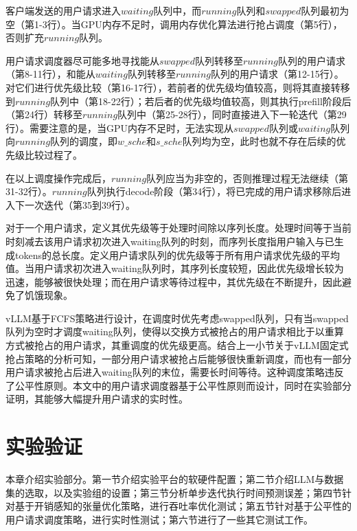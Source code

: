 \documentclass[a4paper, nosysfonts]{hpcchina}
\begin{document}
客户端发送的用户请求进入$waiting$队列中，而$running$队列和$swapped$队列最初为空（第1-3行）。当GPU内存不足时，调用内存优化算法进行抢占调度（第5行），否则扩充$running$队列。 \par
用户请求调度器尽可能多地寻找能从$swapped$队列转移至$running$队列的用户请求（第8-11行），和能从$waiting$队列转移至$running$队列的用户请求（第12-15行）。对它们进行优先级比较（第16-17行），若前者的优先级均值较高，则将其直接转移到$running$队列中（第18-22行）；若后者的优先级均值较高，则其执行prefill阶段后（第24行）转移至$running$队列中（第25-28行），同时直接进入下一轮迭代（第29行）。需要注意的是，当GPU内存不足时，无法实现从$swapped$队列或$waiting$队列向$running$队列的调度，即$w\_sche$和$s\_sche$队列均为空，此时也就不存在后续的优先级比较过程了。 \par
在以上调度操作完成后，$running$队列应当为非空的，否则推理过程无法继续（第31-32行）。$running$队列执行decode阶段（第34行），将已完成的用户请求移除后进入下一次迭代（第35到39行）。 \par
对于一个用户请求，定义其优先级等于处理时间除以序列长度。处理时间等于当前时刻减去该用户请求初次进入waiting队列的时刻，而序列长度指用户输入与已生成tokens的总长度。定义用户请求队列的优先级等于所有用户请求优先级的平均值。当用户请求初次进入waiting队列时，其序列长度较短，因此优先级增长较为迅速，能够被很快处理；而在用户请求等待过程中，其优先级在不断提升，因此避免了饥饿现象。 \par
vLLM基于FCFS策略进行设计，在调度时优先考虑swapped队列，只有当swapped队列为空时才调度waiting队列，使得以交换方式被抢占的用户请求相比于以重算方式被抢占的用户请求，其重调度的优先级更高。结合上一小节关于vLLM固定式抢占策略的分析可知，一部分用户请求被抢占后能够很快重新调度，而也有一部分用户请求被抢占后进入waiting队列的末位，需要长时间等待。这种调度策略违反了公平性原则。本文中的用户请求调度器基于公平性原则而设计，同时在实验部分证明，其能够大幅提升用户请求的实时性。

\section{实验验证}
本章介绍实验部分。第一节介绍实验平台的软硬件配置；第二节介绍LLM与数据集的选取，以及实验组的设置；第三节分析单步迭代执行时间预测误差；第四节针对基于开销感知的张量优化策略，进行吞吐率优化测试；第五节针对基于公平性的用户请求调度策略，进行实时性测试；第六节进行了一些其它测试工作。
\end{document}
